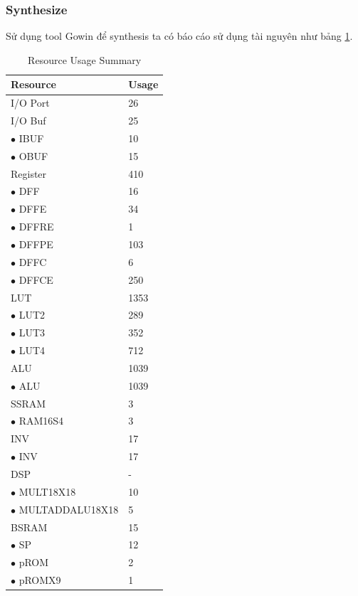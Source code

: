 \subsubsection{Synthesize}
Sử dụng tool Gowin để synthesis ta có báo cáo sử dụng tài nguyên như bảng \ref{tab:resource_usage_summary}.
\begin{table}[H]
\centering
\caption{Resource Usage Summary}
\label{tab:resource_usage_summary}
\begin{tabular}{ll}
\toprule
\textbf{Resource} & \textbf{Usage} \\
\midrule
I/O Port & 26 \\
I/O Buf & 25 \\
\quad $\bullet$ IBUF & 10 \\
\quad $\bullet$ OBUF & 15 \\
Register & 410 \\
\quad $\bullet$ DFF & 16 \\
\quad $\bullet$ DFFE & 34 \\
\quad $\bullet$ DFFRE & 1 \\
\quad $\bullet$ DFFPE & 103 \\
\quad $\bullet$ DFFC & 6 \\
\quad $\bullet$ DFFCE & 250 \\
LUT & 1353 \\
\quad $\bullet$ LUT2 & 289 \\
\quad $\bullet$ LUT3 & 352 \\
\quad $\bullet$ LUT4 & 712 \\
ALU & 1039 \\
\quad $\bullet$ ALU & 1039 \\
SSRAM & 3 \\
\quad $\bullet$ RAM16S4 & 3 \\
INV & 17 \\
\quad $\bullet$ INV & 17 \\
DSP & - \\
\quad $\bullet$ MULT18X18 & 10 \\
\quad $\bullet$ MULTADDALU18X18 & 5 \\
BSRAM & 15 \\
\quad $\bullet$ SP & 12 \\
\quad $\bullet$ pROM & 2 \\
\quad $\bullet$ pROMX9 & 1 \\
\bottomrule
\end{tabular}
\end{table}

